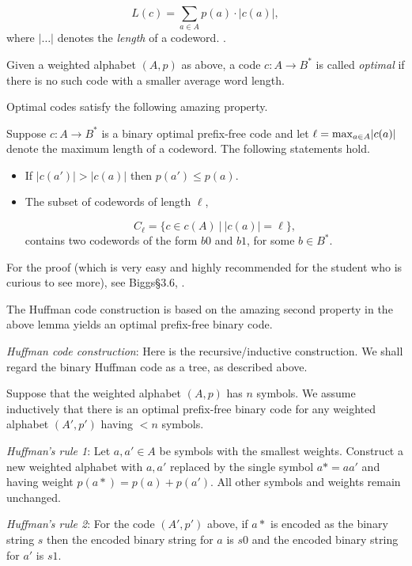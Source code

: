 \[
L(c) = \sum_{a\in A} p(a)\cdot |c(a)|,
\]
where $|\dots |$ denotes the {\it length} of a codeword.
.

Given a weighted alphabet $(A,p)$ as above,
a code $c:A\to B^*$ is called {\it optimal} if there
is no such code with a smaller average word length.

Optimal codes satisfy the following amazing property.

\begin{lemma}
{\rm
Suppose $c:A\to B^*$ is a binary optimal prefix-free code
and let $\ell = {\rm max}_{a\in A} |c(a)|$ denote
the maximum length of a codeword.
The following statements hold.
\begin{itemize}
\item
If $|c(a')|>|c(a)|$ then $p(a')\leq p(a)$.
\item
The subset of codewords of length $\ell$,

\[
C_\ell = \{c\in c(A)\ |\ |c(a)|=\ell\},
\]
contains two codewords of the form
$b0$ and $b1$, for some $b\in B^*$.

\end{itemize}
}
\end{lemma}

For the proof (which is very easy and highly recommended for the
student who is curious to see more), see Biggs\S 3.6, \cite{Biggs2009}.

The Huffman code construction is based on the
amazing second property in the above lemma
yields an optimal prefix-free binary code.

{\it Huffman code construction}: Here is the recursive/inductive
construction. We shall regard the binary Huffman code as a tree,
as described above.

Suppose that the weighted alphabet $(A,p)$ has $n$ symbols.
We assume inductively that there is an optimal prefix-free
binary code for any weighted alphabet $(A',p')$ having
$<n$ symbols.

\noindent
{\it Huffman's rule 1}:
Let $a,a'\in A$ be symbols with the smallest weights.
Construct a new weighted alphabet with
$a,a'$ replaced by the single symbol $a*=aa'$
and having weight $p(a*)=p(a)+p(a')$.
All other symbols and weights remain unchanged.

\noindent
{\it Huffman's rule 2}:
For the code $(A',p')$ above, if $a*$ is encoded
as the binary string $s$ then the encoded binary string for
$a$ is $s0$ and the encoded binary string for
$a'$ is $s1$.

